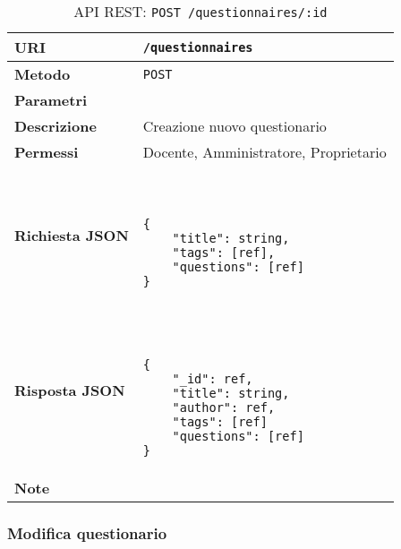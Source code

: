         \begin{table}[H]
            \begin{center}
                \begin{tabular}{p{} p{}}
                    \toprule
                    \textbf{URI} & \texttt{/questionnaires} \\ \midrule
                    \textbf{Metodo} & \texttt{POST} \\ \midrule
                    \textbf{Parametri} & \\ \midrule
                    \textbf{Descrizione} & Creazione nuovo questionario \\ \midrule
                    \textbf{Permessi} & Docente, Amministratore, Proprietario  \\ \midrule
                    \textbf{Richiesta JSON} & \
                        \begin{lstlisting}[basicstyle={\ttfamily}]
{
    "title": string,
    "tags": [ref],
    "questions": [ref] 
}
                        \end{lstlisting}
                        \\ \midrule
                    \textbf{Risposta JSON} & \
                        \begin{lstlisting}[basicstyle={\ttfamily}]
{
    "_id": ref,
    "title": string,
    "author": ref,
    "tags": [ref]
    "questions": [ref] 
}
                        \end{lstlisting}
                        \\ \midrule
                    \textbf{Note} & \\
                    \bottomrule
                \end{tabular}
                \caption{API REST: \texttt{POST /questionnaires/:id}}
            \end{center}
        \end{table}

    \subsubsection{Modifica questionario}

